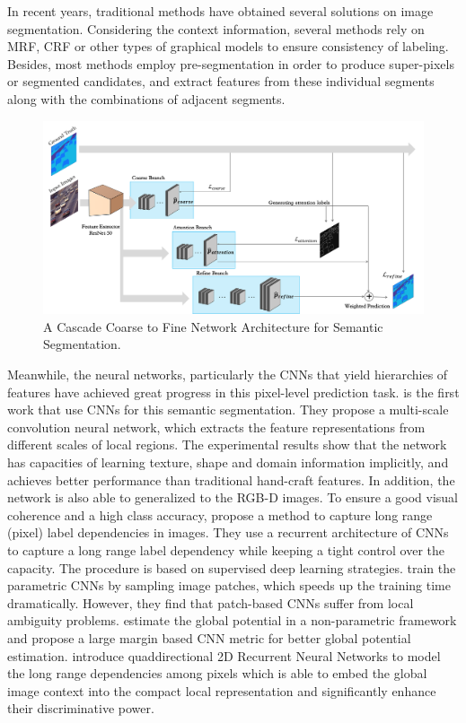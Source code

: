\documentclass[10.5pt,compsoc]{TsT}
\newcommand{\upcite}[1]{\superscript{\textsuperscript{\cite{#1}}}}
\theoremstyle{mystyle}
\newcommand{\upcite}[1]{\textsuperscript{\cite{#1}}}
\begin{document}
{In recent years, traditional methods have obtained several solutions on image segmentation. Considering the context information, several methods rely on MRF, CRF or other types of graphical models to ensure consistency of labeling\upcite{8-10}. Besides, most methods employ pre-segmentation in order to produce super-pixels or segmented candidates, and extract features from these individual segments along with the combinations of adjacent segments.
\begin{figure}[!ht]
\centering
\includegraphics[width=1.9\columnwidth]{fig2.png}
\caption{A Cascade Coarse to Fine Network Architecture for Semantic Segmentation.}
\label{fig2}
\end{figure} 

Meanwhile, the neural networks, particularly the CNNs that yield hierarchies of features have achieved great progress in  this pixel-level prediction task. \cite{11} is the first work that use CNNs for this semantic segmentation. They propose a multi-scale convolution neural network, which extracts the feature representations from different scales of local regions. The experimental results show that the network has capacities of learning texture, shape and domain information implicitly, and achieves better performance than traditional hand-craft features. In addition, the network is also able to generalized to the RGB-D images\upcite{12}. To ensure a good visual coherence and a high class accuracy, \cite{13} propose a method to capture long range (pixel) label dependencies in images. They use a recurrent architecture of CNNs to capture a long range label dependency while keeping a tight control over the capacity. The procedure is based on supervised deep learning strategies. \cite{14-16} train the parametric CNNs by sampling image patches, which speeds up the training time dramatically. However, they find that patch-based CNNs suffer from local ambiguity problems. \cite{14} estimate the global potential in a non-parametric framework and propose a large margin based CNN metric for better global potential estimation. \cite{15,16} introduce quaddirectional 2D Recurrent Neural Networks to model the long range dependencies among pixels which is able to embed the global image context into the compact local representation and significantly enhance their discriminative power.


}
\end{document}
